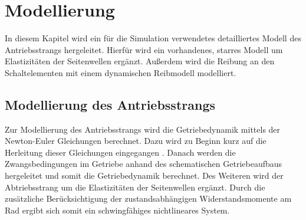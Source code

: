 \chapter{Modellierung}\label{ch:ch2}
In diesem Kapitel wird ein für die Simulation verwendetes detailliertes Modell des Antriebsstrangs hergeleitet. Hierfür wird ein vorhandenes, starres Modell um Elastizitäten der Seitenwellen ergänzt. Außerdem wird die Reibung an den Schaltelementen mit einem dynamischen Reibmodell modelliert.


\section{Modellierung des Antriebsstrangs}
Zur Modellierung des Antriebsstrangs wird die Getriebedynamik mittels der Newton-Euler Gleichungen berechnet. Dazu wird zu Beginn kurz auf die Herleitung dieser Gleichungen eingegangen \cite{Schiehlen.2017}. Danach werden die Zwangsbedingungen im Getriebe anhand des schematischen Getriebeaufbaus hergeleitet und somit die Getriebedynamik berechnet. Des Weiteren wird der Abtriebsstrang um die Elastizitäten der Seitenwellen ergänzt. Durch die zusätzliche Berücksichtigung der zustandsabhängigen Widerstandsmomente am Rad ergibt sich somit ein schwingfähiges nichtlineares System. 

